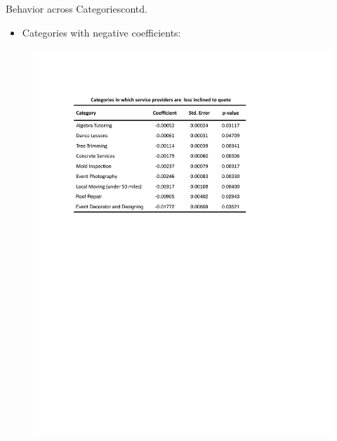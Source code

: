 \documentclass{beamer}
\begin{document}
\begin{frame}{Behavior across Categories}{contd.}
	\vspace{-0. in}
	\begin{itemize}
		\item {Categories with negative coefficients:}  
	\end{itemize}
		\vspace{-0.1 in}
	\begin{figure}{}
		\vspace*{-0 in}
		\scalebox{1}
		{\hspace*{-0 in}\includegraphics[scale=0.7]{coef_cat_less.pdf} }
	\end{figure}	
	\vspace*{-0 in}
\end{frame}		
\end{document}
